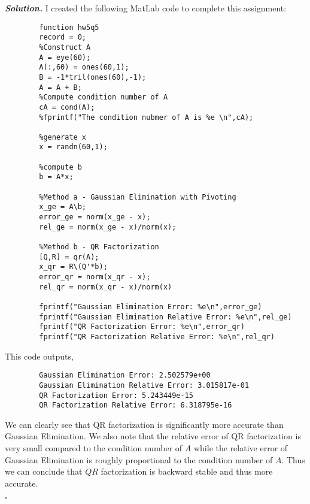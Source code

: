 \documentclass[12pt]{report}
\newenvironment{solution}[1][\it{Solution}]{\textbf{#1. } }{$\square$}
\begin{document}
\begin{solution}
    \noindent
    I created the following MatLab code to complete this assignment:
    \begin{verbatim}
        function hw5q5
        record = 0;
        %Construct A
        A = eye(60);
        A(:,60) = ones(60,1);
        B = -1*tril(ones(60),-1);
        A = A + B;
        %Compute condition number of A
        cA = cond(A);
        %fprintf("The condition nubmer of A is %e \n",cA);
        
        %generate x
        x = randn(60,1);
        
        %compute b
        b = A*x;
        
        %Method a - Gaussian Elimination with Pivoting
        x_ge = A\b;
        error_ge = norm(x_ge - x);
        rel_ge = norm(x_ge - x)/norm(x);
        
        %Method b - QR Factorization
        [Q,R] = qr(A);
        x_qr = R\(Q'*b);
        error_qr = norm(x_qr - x);
        rel_qr = norm(x_qr - x)/norm(x)
        
        fprintf("Gaussian Elimination Error: %e\n",error_ge)
        fprintf("Gaussian Elimination Relative Error: %e\n",rel_ge)
        fprintf("QR Factorization Error: %e\n",error_qr)
        fprintf("QR Factorization Relative Error: %e\n",rel_qr)        
    \end{verbatim}
    This code outputs,
    \begin{verbatim}
        Gaussian Elimination Error: 2.502579e+00
        Gaussian Elimination Relative Error: 3.015817e-01
        QR Factorization Error: 5.243449e-15
        QR Factorization Relative Error: 6.318795e-16
    \end{verbatim}
    We can clearly see that QR factorization is significantly more accurate than Gaussian Elimination. We also note that the relative error of QR factorization is very small compared to the condition number of $A$ while the relative error of Gaussian Elimination is roughly proportional to the condition number of $A$. Thus we can conclude that $QR$ factorization is backward stable and thus more accurate.   



\end{solution}
\end{document}

